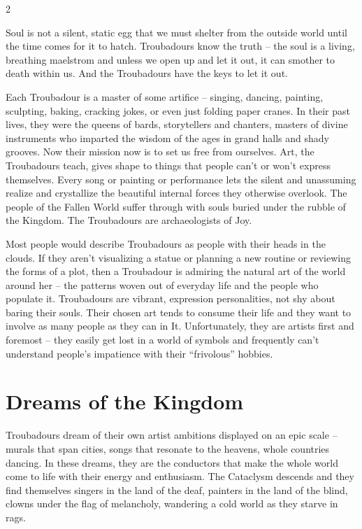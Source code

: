 \label{scha:Troubadour}\begin{multicols}{2}\raggedcolumns

\noindent Soul is not a silent, static egg that we must shelter from the outside world until the time comes for it to hatch. Troubadours know the truth – the soul is a living, breathing maelstrom and unless we open up and let it out, it can smother to death within us. And the Troubadours have the keys to let it out.

Each Troubadour is a master of some artifice – singing, dancing, painting, sculpting, baking, cracking jokes, or even just folding paper cranes. In their past lives, they were the queens of bards, storytellers and chanters, masters of divine instruments who imparted the wisdom of the ages in grand halls and shady grooves. Now their mission now is to set us free from ourselves. Art, the Troubadours teach, gives shape to things that people can't or won't express themselves. Every song or painting or performance lets the silent and unassuming realize and crystallize the beautiful internal forces they otherwise overlook. The people of the Fallen World suffer through with souls buried under the rubble of the Kingdom. The Troubadours are archaeologists of Joy.

Most people would describe Troubadours as people with their heads in the clouds. If they aren't visualizing a statue or planning a new routine or reviewing the forms of a plot, then a Troubadour is admiring the natural art of the world around her – the patterns woven out of everyday life and the people who populate it. Troubadours are vibrant, expression personalities, not shy about baring their souls. Their chosen art tends to consume their life and they want to involve as many people as they can in It. Unfortunately, they are artists first and foremost – they easily get lost in a world of symbols and frequently can't understand people's impatience with their “frivolous” hobbies. 

\section*{Dreams of the Kingdom}

Troubadours dream of their own artist ambitions displayed on an epic scale – murals that span cities, songs that resonate to the heavens, whole countries dancing. In these dreams, they are the conductors that make the whole world come to life with their energy and enthusiasm. The Cataclysm descends and they find themselves singers in the land of the deaf, painters in the land of the blind, clowns under the flag of melancholy, wandering a cold world as they starve in rags. 


\end{multicols}
